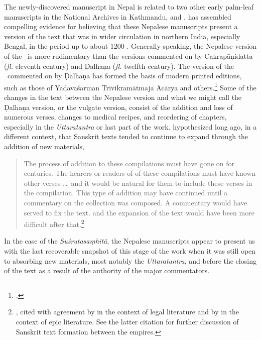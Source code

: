 The newly-discovered manuscript in Nepal is related to two other early palm-leaf
manuscripts in the National Archives in Kathmandu, 
and . \citet{kleb-2010,kleb-2021b} has assembled
compelling evidence for believing that these Nepalese manuscripts present a
version of the text that was in wider circulation in northern India, especially
Bengal, in the period up to about 1200 \CE. Generally speaking, the Nepalese
version of the \SS\ is more rudimentary than the versions commented on by
Cakrapāṇidatta (\emph{fl.} eleventh century) and Ḍalhaṇa (\emph{fl.} twelfth
century).  The version of the \SS\ commented on by Ḍalhaṇa has formed the basis of
modern printed editions, such as those of Yadavaśarman Trivikramātmaja Ācārya and
others.\footcite{susr-trikamji1,vulgate,shar-susr}  Some of the changes in the
text between the Nepalese version and what we might call the Ḍalhaṇa version, or
the vulgate version, consist of the addition and loss of numerous verses, changes
to medical recipes, and reordering of chapters, especially in the \emph{Uttaratantra} or
last part of the work.  \citeauthor{lari-2003} hypothesized long ago, in a
different context, that Sanskrit texts tended to continue to expand through the
addition of new materials,
\begin{quote}
The process of addition to these compilations must have gone on for centuries. The
hearers or readers of of these compilations must have known other verses \ldots\
and it would be natural for them to include these verses in the compilation. This
type of  addition may have continued until a commentary on the collection was
composed.     A commentary would have served to fix the text. and the expansion of
the text   would have been more difficult after
that.\footnote{\cite[xii]{lari-2003}, cited with agreement by
\citet[51]{oliv-manu} in the context of legal literature and by
\citet[62--63]{bron-how} in the context of epic literature.  See the latter citation for further 
discussion of Sanskrit text formation between the empires.}
\end{quote}
In the case of the \emph{Suśrutasaṃhitā}, the Nepalese manuscripts appear to present us 
with the last recoverable snapshot of this stage of the work when it was still open to 
absorbing new materials, most notably the \emph{Uttaratantra}, and before the closing of 
the text 
as a result of the authority of the major commentators.

